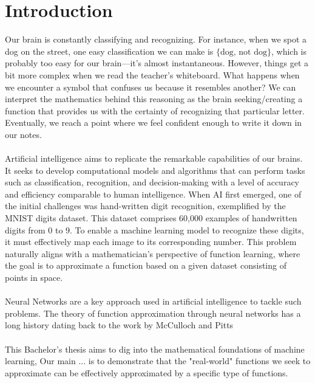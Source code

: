 \documentclass[../main.tex]{subfiles}
\begin{document}
    \chapter{Introduction} \label{ch:intro}
    


\noindent Our brain is constantly classifying and recognizing. For instance, when we spot a dog on the street, one easy classification we can make is  $\{ \text{dog, not dog} \}$, which is probably too easy for our brain—it's almost instantaneous.  However, things get a bit more complex when we read the teacher's whiteboard. What happens when we encounter a symbol that confuses us because it resembles another?
We can interpret the mathematics behind this reasoning as the brain seeking/creating a function that provides us with the certainty of recognizing that particular letter. Eventually, we reach a point where we feel confident enough to write it down in our notes. \\ \\
Artificial intelligence aims to replicate the remarkable capabilities of our brains. It seeks to develop computational models and algorithms that can perform tasks such as classification, recognition, and decision-making with a level of accuracy and efficiency comparable to human intelligence. When AI first emerged, one of the initial challenges was hand-written digit recognition, exemplified by the MNIST digits dataset. This dataset comprises 60,000 examples of handwritten digits from 0 to 9. To enable a machine learning model to recognize these digits, it must effectively map each image to its corresponding number.
This problem naturally aligns with a mathematician's perspective of function learning, where the goal is to approximate a function based on a given dataset consisting of points in space.
\\ \\ 
Neural Networks are a key approach used in artificial intelligence to tackle such problems.  The theory of function approximation through neural networks has a long history dating back to the work by McCulloch and Pitts \\ \\
This Bachelor's thesis aims to dig into the mathematical foundations of machine learning, 
Our main ... is to demonstrate that the "real-world" functions we seek to approximate can be effectively approximated by a specific type of functions. \\ \\ 
\end{document}
